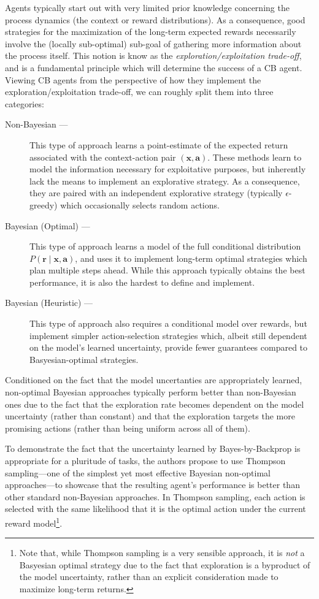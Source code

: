 \documentclass[11pt]{article}
\begin{document}
Agents typically start out with very limited prior knowledge concerning the
process dynamics (the context or reward distributions).  As a consequence, good
strategies for the maximization of the long-term expected rewards necessarily
involve the (locally sub-optimal) sub-goal of gathering more information about
the process itself.  This notion is know as the \emph{exploration/exploitation
trade-off}, and is a fundamental principle which will determine the success of
a CB agent.  Viewing CB agents from the perspective of how they implement the
exploration/exploitation trade-off, we can roughly split them into three
categories:
%
\begin{description}
  \item[Non-Bayesian ---]  This type of approach learns a point-estimate of the
    expected return associated with the context-action pair $(\bm x, \bm a)$.
    These methods learn to model the information necessary for exploitative
    purposes, but inherently lack the means to implement an explorative
    strategy.  As a consequence, they are paired with an independent
    explorative strategy (typically $\epsilon$-greedy) which occasionally
    selects random actions.
  \item[Bayesian (Optimal) ---]  This type of approach learns a model of the
    full conditional distribution $P(\bm r\mid \bm x, \bm a)$, and uses it to
    implement long-term optimal strategies which plan multiple steps ahead.
    While this approach typically obtains the best performance, it is also the
    hardest to define and implement.
  \item[Bayesian (Heuristic) ---]  This type of approach also requires
    a conditional model over rewards, but implement simpler action-selection
    strategies which, albeit still dependent on the model's learned uncertainty,
    provide fewer guarantees compared to Basyesian-optimal strategies.  
\end{description}

Conditioned on the fact that the model uncertanties are appropriately learned,
non-optimal Bayesian approaches typically perform better than non-Bayesian ones
due to the fact that the exploration rate becomes dependent on the model
uncertainty (rather than constant) and that the exploration targets the more
promising actions (rather than being uniform across all of them).

To demonstrate the fact that the uncertainty learned by Bayes-by-Backprop is
appropriate for a pluritude of tasks, the authors propose to use Thompson
sampling---one of the simplest yet most effective Bayesian non-optimal
approaches---to showcase that the resulting agent's performance is better than
other standard non-Bayesian approaches.  In Thompson sampling, each action is
selected with the same likelihood that it is the optimal action under the
current reward model\footnote{Note that, while Thompson sampling is a very
sensible approach, it is \emph{not} a Basyesian optimal strategy due to the
fact that exploration is a byproduct of the model uncertainty, rather than an
explicit consideration made to maximize long-term returns.}.  
\end{document}
